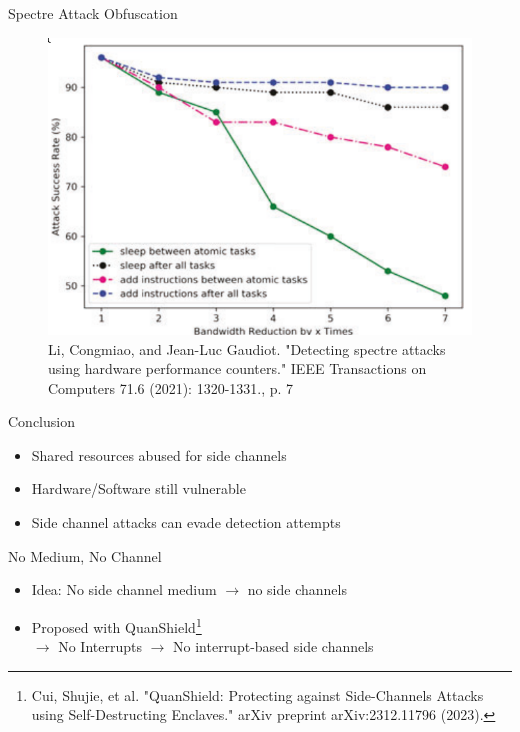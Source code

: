 \documentclass[aspectratio=169]{beamer}
\begin{document}
\begin{frame}{Spectre Attack Obfuscation}
    \begin{center}
        \begin{figure}
            \includegraphics[width=.5\textwidth]{images/evasive_spectre.png}
            \caption{{\footnotesize{Li, Congmiao, and Jean-Luc Gaudiot. "Detecting spectre attacks using hardware performance counters." IEEE Transactions on Computers 71.6 (2021): 1320-1331., p. 7}}}
        \end{figure}
    \end{center}
\end{frame}
\begin{frame}{Conclusion}
    \begin{itemize}
        \item Shared resources abused for side channels
        \item Hardware/Software still vulnerable
        \item Side channel attacks can evade detection attempts
    \end{itemize}
\end{frame}
\begin{frame}{No Medium, No Channel}
    \begin{itemize}
        \item Idea: No side channel medium $\rightarrow$ no side channels
        \item Proposed with QuanShield\footnote{Cui, Shujie, et al. "QuanShield: Protecting against Side-Channels Attacks using Self-Destructing Enclaves." arXiv preprint arXiv:2312.11796 (2023).}\\
              $\rightarrow$ No Interrupts $\rightarrow$ No interrupt-based side channels
    \end{itemize}
\end{frame}
\end{document}
